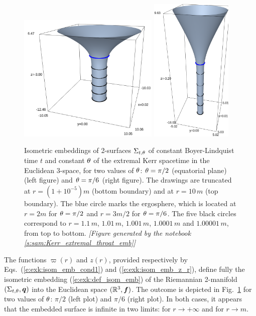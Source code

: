 \begin{figure}
\centerline{\includegraphics[width=0.6\textwidth]{exk_throat_emb_equat.png}
\includegraphics[width=0.35\textwidth]{exk_throat_emb_pi6.png}
}
\caption[]{\label{f:exk:throat_emb} \footnotesize
Isometric embeddings of 2-surfaces $\Sigma_{t,\theta}$ of constant Boyer-Lindquist time $t$
and constant $\theta$ of the extremal Kerr spacetime in the Euclidean 3-space,
for two values of $\theta$: $\theta=\pi/2$ (equatorial plane) (left figure)
and $\theta=\pi/6$ (right figure). The drawings are truncated at
$r=(1 + 10^{-5})m$ (bottom boundary) and at $r=10\, m$
(top boundary). The blue circle marks the ergosphere, which is located at
$r=2m$ for $\theta=\pi/2$ and $r=3m/2$ for $\theta=\pi/6$. The five black circles
correspond to $r = 1.1\, m$, $1.01\, m$, $1.001\, m$, $1.0001\, m$
and $1.00001\, m$, from top to bottom.
\textsl{[Figure generated by the notebook \ref{s:sam:Kerr_extremal_throat_emb}]}
}
\end{figure}

The functions $\varpi(r)$ and $z(r)$, provided respectively by Eqs.~(\ref{e:exk:isom_emb_cond1})
and (\ref{e:exk:isom_emb_z_r}), define fully the isometric embedding
(\ref{e:exk:def_isom_emb}) of the Riemannian 2-manifold $(\Sigma_{t,\theta}, \bm{q})$ into
the Euclidean space $(\mathbb{R}^3,\bm{f})$.
The outcome is depicted in Fig.~\ref{f:exk:throat_emb}
for two values of $\theta$: $\pi/2$ (left plot) and $\pi/6$ (right plot).
In both cases, it appears that the embedded surface is infinite in two limits:
for $r\to +\infty$ and for $r\to m$.

